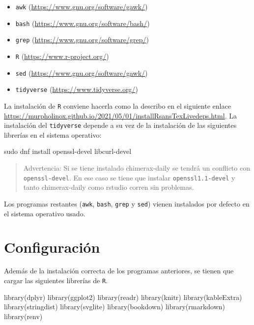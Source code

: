 \documentclass[
]{book}
\newenvironment{Shaded}{\begin{snugshade}}{\end{snugshade}}
\newcommand{\FunctionTok}[1]{\textcolor[rgb]{0.00,0.00,0.00}{#1}}
\newcommand{\NormalTok}[1]{#1}
\providecommand{\tightlist}{%
  \setlength{\itemsep}{0pt}\setlength{\parskip}{0pt}}
\theoremstyle{definition}
\theoremstyle{definition}
\theoremstyle{definition}
\theoremstyle{definition}
\theoremstyle{remark}
\begin{document}
\begin{itemize}
\tightlist
\item
  \texttt{awk} (\url{https://www.gnu.org/software/gawk/})
\item
  \texttt{bash} (\url{https://www.gnu.org/software/bash/})
\item
  \texttt{grep} (\url{https://www.gnu.org/software/grep/})
\item
  \texttt{R} (\url{https://www.r-project.org/})
\item
  \texttt{sed} (\url{https://www.gnu.org/software/gawk/})
\item
  \texttt{tidyverse} (\url{https://www.tidyverse.org/})
\end{itemize}

La instalación de \texttt{R} conviene hacerla como la describo en el siguiente enlace \url{https://murpholinox.github.io/2021/05/01/installRsansTexLivedeps.html}. La instalación del \texttt{tidyverse} depende a su vez de la instalación de las siguientes librerías en el sistema operativo:

\begin{Shaded}
\begin{Highlighting}[]
\FunctionTok{sudo}\NormalTok{ dnf install openssl{-}devel libcurl{-}devel}
\end{Highlighting}
\end{Shaded}

\begin{quote}
Advertencia: Si se tiene instalado chimerax-daily se tendrá un conflicto con \texttt{openssl-devel}. En ese caso se tiene que instalar \texttt{openssl1.1-devel} y tanto chimerax-daily como rstudio corren sin problemas.
\end{quote}

Los programas restantes (\texttt{awk}, \texttt{bash}, \texttt{grep} y \texttt{sed}) vienen instalados por defecto en el sistema operativo usado.

\hypertarget{configuraciuxf3n}{%
\section{Configuración}\label{configuraciuxf3n}}

Además de la instalación correcta de los programas anteriores, se tienen que cargar las siguientes librerías de \texttt{R}.

\begin{Shaded}
\begin{Highlighting}[]
\FunctionTok{library}\NormalTok{(dplyr)}
\FunctionTok{library}\NormalTok{(ggplot2)}
\FunctionTok{library}\NormalTok{(readr)}
\FunctionTok{library}\NormalTok{(knitr)}
\FunctionTok{library}\NormalTok{(kableExtra)}
\FunctionTok{library}\NormalTok{(stringdist)}
\FunctionTok{library}\NormalTok{(svglite)}
\FunctionTok{library}\NormalTok{(bookdown)}
\FunctionTok{library}\NormalTok{(rmarkdown)}
\FunctionTok{library}\NormalTok{(renv)}
\end{Highlighting}
\end{Shaded}
\end{document}
